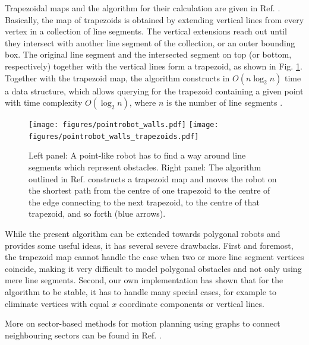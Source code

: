 Trapezoidal maps and the algorithm for their calculation are given in Ref. 
\cite[Ch. 6, pp. 121-146]{Berg2008}. Basically, the map of trapezoids is obtained 
by extending vertical lines from every vertex in a collection of line segments. 
The vertical extensions reach out until they intersect with another line segment 
of the collection, or an outer bounding box. The original line segment and the 
intersected segment on top (or bottom, respectively) together with the vertical 
lines form a trapezoid, as shown in Fig. \ref{fig:robot_trapezoids}. 
Together with the trapezoid map, the algorithm constructs in 
$O \left(n \log_{2} n \right)$ time a data structure, which allows querying for 
the trapezoid containing a given point with time complexity $O \left( \log_{2} n \right)$, 
where $n$ is the number of line segments \cite[Theorem 6.3, p. 133]{Berg2008}.

\begin{figure}[htb]
	\centering
	\texttt{[image: figures/pointrobot\_walls.pdf]}
	\hspace{1 cm}
	\texttt{[image: figures/pointrobot\_walls\_trapezoids.pdf]}
	\caption[Pathfinding using trapezoid maps.]{
		Left panel: A point-like robot has to find a way around line segments 
		which represent obstacles. 
		Right panel: The algorithm outlined in Ref. \cite[p. 289]{Berg2008} 
		constructs a trapezoid map and moves the robot on the shortest path from 
		the centre of one trapezoid to the centre of the edge connecting to the 
		next trapezoid, to the centre of that trapezoid, and so forth (blue arrows).}
	\label{fig:robot_trapezoids}
\end{figure}

While the present algorithm can be extended towards polygonal robots \cite[Ch. 13.3, pp. 290-297]{Berg2008} 
and provides some useful ideas, it has several severe drawbacks. First and 
foremost, the trapezoid map cannot handle the case when two or more line segment 
vertices coincide, making it very difficult to model polygonal obstacles and not 
only using mere line segments. Second, our own implementation has shown that for 
the algorithm to be stable, it has to handle many special cases, for example to 
eliminate vertices with equal $x$ coordinate components or vertical lines.

More on sector-based methods for motion planning using graphs to connect neighbouring
sectors can be found in Ref. \cite{Choset2010_ch6}.

\vspace{0.5cm}


